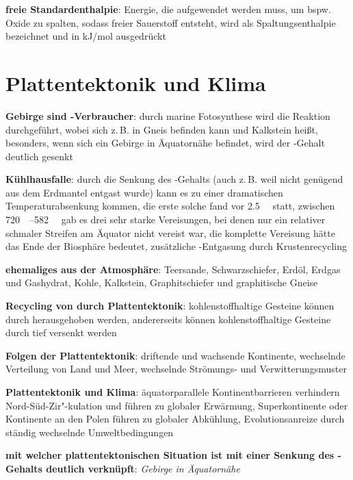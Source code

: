\textbf{freie Standardenthalpie}:
Energie, die aufgewendet werden muss, um bspw. Oxide zu spalten, sodass freier Sauerstoff entsteht,
wird als Spaltungsenthalpie bezeichnet und in \si{\kilo\joule/\mol} ausgedrückt

\pagebreak

\section{%
    Plattentektonik und Klima%
}

\textbf{Gebirge sind -Verbraucher}:
durch marine Fotosynthese wird die Reaktion
 durchgeführt,
wobei sich  z.\,B. in Gneis befinden kann und  Kalkstein heißt,
besonders, wenn sich ein Gebirge in Äquatornähe befindet, wird der -Gehalt deutlich gesenkt

\textbf{Kühlhausfalle}:
durch die Senkung des -Gehalts
(auch z.\,B. weil nicht genügend  aus dem Erdmantel entgast wurde)
kann es zu einer dramatischen Temperaturabsenkung kommen,
die erste solche fand vor \SI{2.5}{\mega\year} statt,
zwischen \SIrange{720}{582}{\mega\year} gab es drei sehr starke Vereisungen,
bei denen nur ein relativer schmaler Streifen am Äquator nicht vereist war,
die komplette Vereisung hätte das Ende der Biosphäre bedeutet,
zusätzliche -Entgasung durch Krustenrecycling

\textbf{ehemaliges  aus der Atmosphäre}:
Teersande,
Schwarzschiefer,
Erdöl,
Erdgas und Gashydrat,
Kohle,
Kalkstein,
Graphitschiefer und graphitische Gneise

\textbf{Recycling von  durch Plattentektonik}:
kohlenstoffhaltige Gesteine können durch
herausgehoben werden,
andererseits können kohlenstoffhaltige Gesteine durch
tief versenkt werden

\textbf{Folgen der Plattentektonik}:
driftende und wachsende Kontinente,
wechselnde Verteilung von Land und Meer,
wechselnde Strömungs- und Verwitterungsmuster

\textbf{Plattentektonik und Klima}:
äquatorparallele Kontinentbarrieren verhindern Nord-Süd-Zir"-kulation und führen zu
globaler Erwärmung,
Superkontinente oder Kontinente an den Polen führen zu globaler Abkühlung,
Evolutionsanreize durch ständig wechselnde Umweltbedingungen

\begin{wichtig}
    \item
    \textbf{mit welcher plattentektonischen Situation ist mit einer Senkung des -Gehalts
    deutlich verknüpft}:
    \emph{Gebirge in Äquatornähe}
\end{wichtig}

